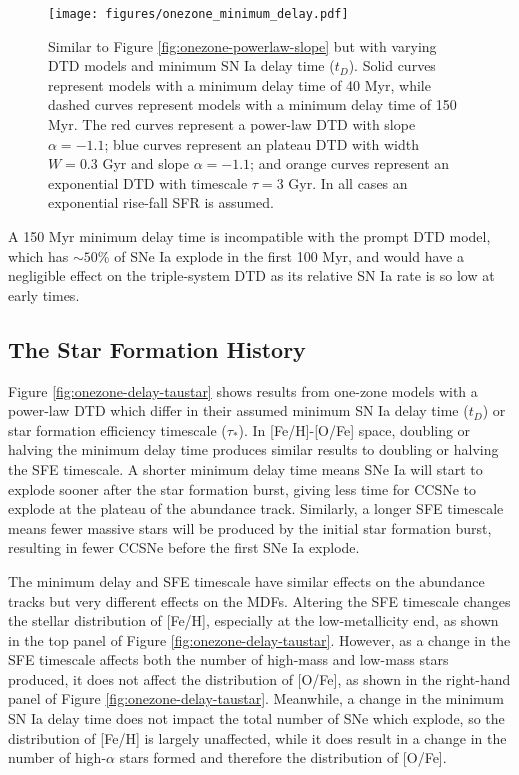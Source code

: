 \documentclass[twocolumn,linenumbers,twocolappendix]{aastex631}
\begin{document}
\begin{figure}
    \centering
    \texttt{[image: figures/onezone\_minimum\_delay.pdf]}
    \caption{Similar to Figure \ref{fig:onezone-powerlaw-slope} but with varying DTD models and minimum SN Ia delay time ($t_D$). Solid curves represent models with a minimum delay time of 40 Myr, while dashed curves represent models with a minimum delay time of 150 Myr. The red curves represent a power-law DTD with slope $\alpha=-1.1$; blue curves represent an plateau DTD with width $W=0.3$ Gyr and slope $\alpha=-1.1$; and orange curves represent an exponential DTD with timescale $\tau=3$ Gyr. In all cases an exponential rise-fall SFR is assumed.}
    \label{fig:onezone-minimum-delay}
\end{figure}

A 150 Myr minimum delay time is incompatible with the prompt DTD model, which has $\sim 50$\% of SNe Ia explode in the first 100 Myr, and would have a negligible effect on the triple-system DTD as its relative SN Ia rate is so low at early times.

\subsection{The Star Formation History}

Figure \ref{fig:onezone-delay-taustar} shows results from one-zone models with a power-law DTD which differ in their assumed minimum SN Ia delay time ($t_D$) or star formation efficiency timescale ($\tau_*$). In [Fe/H]-[O/Fe] space, doubling or halving the minimum delay time produces similar results to doubling or halving the SFE timescale. A shorter minimum delay time means SNe Ia will start to explode sooner after the star formation burst, giving less time for CCSNe to explode at the plateau of the abundance track. Similarly, a longer SFE timescale means fewer massive stars will be produced by the initial star formation burst, resulting in fewer CCSNe before the first SNe Ia explode. 

The minimum delay and SFE timescale have similar effects on the abundance tracks but very different effects on the MDFs. Altering the SFE timescale changes the stellar distribution of [Fe/H], especially at the low-metallicity end, as shown in the top panel of Figure \ref{fig:onezone-delay-taustar}. However, as a change in the SFE timescale affects both the number of high-mass and low-mass stars produced, it does not affect the distribution of [O/Fe], as shown in the right-hand panel of Figure \ref{fig:onezone-delay-taustar}. Meanwhile, a change in the minimum SN Ia delay time does not impact the total number of SNe which explode, so the distribution of [Fe/H] is largely unaffected, while it does result in a change in the number of high-$\alpha$ stars formed and therefore the distribution of [O/Fe].
\end{document}
